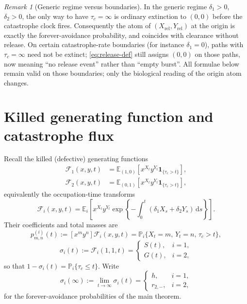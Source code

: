 \documentclass[11pt]{article}
\newcommand{\Prob}{\mathbb P}
\newcommand{\E}{\mathbb E}
\newcommand{\dd}{\mathrm d}
\newcommand{\Xrel}{X_{\mathrm{rel}}}
\newcommand{\Yrel}{Y_{\mathrm{rel}}}
\theoremstyle{plain}
\theoremstyle{definition}
\theoremstyle{remark}
\newtheorem{remark}{Remark}
\begin{document}
\begin{remark}[Generic regime versus boundaries]
\label{rem:generic}
In the generic regime $\delta_1>0$, $\delta_2>0$, the only way to have $\tau_c=\infty$ is ordinary
extinction to $(0,0)$ before the catastrophe clock fires. Consequently the atom of
$(\Xrel,\Yrel)$ at the origin is exactly the forever-avoidance probability, and coincides with
clearance without release. On certain catastrophe-rate boundaries (for instance $\delta_1=0$),
paths with $\tau_c=\infty$ need not be extinct; \cref{eq:release-def} still assigns $(0,0)$ on
those paths, now meaning ``no release event'' rather than ``empty burst''.
All formulae below remain valid on those boundaries; only the biological reading of the origin atom
changes.
\end{remark}

\section{Killed generating function and catastrophe flux}

Recall the killed (defective) generating functions
\begin{subequations}
\label{eq:killed-pgf}
\begin{align}
\mathcal F_1(x,y,t)
&=\E_{(1,0)}
\!\left[x^{X_t}y^{Y_t}\boldsymbol 1_{\{\tau_c>t\}}\right],
\\
\mathcal F_2(x,y,t)
&=\E_{(0,1)}
\!\left[x^{X_t}y^{Y_t}\boldsymbol 1_{\{\tau_c>t\}}\right],
\end{align}
\end{subequations}
equivalently the occupation-time transforms
\begin{equation*}
\mathcal F_i(x,y,t)
=\E_i\!\left[
x^{X_t}y^{Y_t}
\exp\!\left\{-\int_0^t
(\delta_1X_s+\delta_2Y_s)\,\dd s\right\}\right].
\end{equation*}
Their coefficients and total masses are
\begin{equation}
\label{eq:killed-coeff}
p_{m,n}^{(i)}(t)
:=[x^my^n]\mathcal F_i(x,y,t)
=\Prob_i\{X_t=m,\,Y_t=n,\,\tau_c>t\},
\end{equation}
\begin{equation}
\label{eq:sigma}
\sigma_i(t)
:=\mathcal F_i(1,1,t)
=
\begin{cases}
S(t), & i=1,\\
G(t), & i=2,
\end{cases}
\end{equation}
so that $1-\sigma_i(t)=\Prob_i\{\tau_c\le t\}$. Write
\begin{equation}
\label{eq:sigma-infty}
\sigma_i(\infty)
:=\lim_{t\to\infty}\sigma_i(t)
=
\begin{cases}
h, & i=1,\\
r_{2,-}, & i=2,
\end{cases}
\end{equation}
for the forever-avoidance probabilities of the main theorem.
\end{document}
